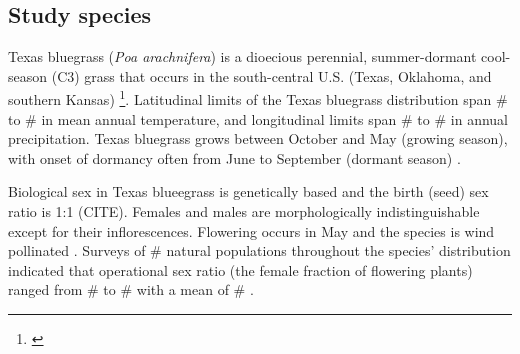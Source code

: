 \documentclass[12pt]{article}
\newcommand{\tom}[2]{{\color{red}{#1}}\footnote{\textit{\color{red}{#2}}}}
\begin{document}
\subsection*{Study species}
Texas bluegrass (\textit{Poa arachnifera}) is a dioecious perennial, summer-dormant cool-season (C3) grass that occurs in the south-central U.S. (Texas, Oklahoma, and southern Kansas) \citep{hitchcock1971manual}\tom{}{I would reference the map figure (current Fig. 1) here. I also suggest either adding the GBIF records to this figure or adding the county occurrences as in the Am Nat paper, because it is important for readers to see the natural distribution early in the paper. The natural population surveys can be cut from this figure because you don't say anything about them and you do not use the data here. ALternatively, there may be value in re-analyzing the sex ratio surveys with your climate covariates. Fig 1 also needs to be updated with labels and units on the climate variable color bars. I recommend putting panels A-C and B-D on the same climate scale.}. 
Latitudinal limits of the Texas bluegrass distribution span \# to \# in mean annual temperature, and longitudinal limits span \# to \# in annual precipitation. 
Texas bluegrass grows between October and May (growing season), with onset of dormancy often from June to September (dormant season) \citep{kindiger2004interspecific}. 

Biological sex in Texas blueegrass is genetically based and the birth (seed) sex ratio is 1:1 (CITE). 
Females and males are morphologically indistinguishable except for their inflorescences. 
Flowering occurs in May and the species is wind pollinated \citep{hitchcock1971manual}. 
Surveys of \# natural populations throughout the species' distribution indicated that operational sex ratio (the female fraction of flowering plants) ranged from \# to \# with a mean of \# \citep{miller2022two}. 
\end{document}
